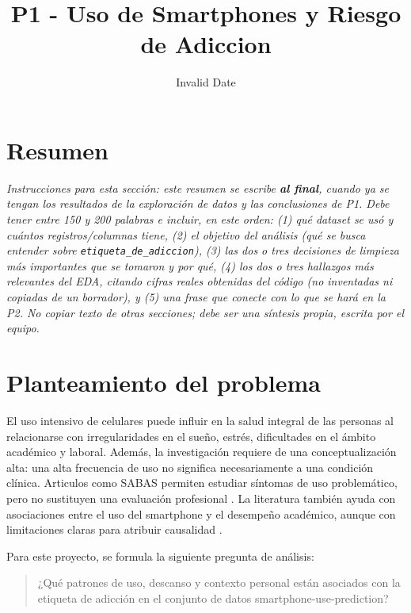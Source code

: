 \documentclass[11pt,spanish,a4paper,]{article}
\title{P1 - Uso de Smartphones y Riesgo de Adiccion}
\author{\sf{\Large\textbf{Hiter Frank Rubio
Peralta}\\\large Alumno\\[0.5cm]}{\Large\textbf{Jossep Jorge Froilan
Choroco Neyra}\\\large Alumno\\[0.5cm]}{\Large\textbf{Joel David De la
Cruz Cardenas}\\\large Alumno\\[0.5cm]}{\Large\textbf{Rodrigo Octavio
Lucatoni Flores Ruiz}\\\large Alumno\\[0.5cm]}{\Large\textbf{Victor
Andres Diaz Garcia}\\\large Alumno\\[0.5cm]}}
\date{Invalid Date}
\makeatletter
\def\titlepage{\front{\expandafter{\@title}}{\@author}{\@organization}}
\makeatother
\begin{document}
\titlepage

{
\hypersetup{linkcolor=black}
\setcounter{tocdepth}{2}
\tableofcontents
}
\listoftables
\listoffigures
\providecommand{\pandocbounded}[1]{#1}

\newpage

\section{Resumen}\label{resumen}

\emph{Instrucciones para esta sección: este resumen se escribe
\textbf{al final}, cuando ya se tengan los resultados de la exploración
de datos y las conclusiones de P1. Debe tener entre 150 y 200 palabras e
incluir, en este orden: (1) qué dataset se usó y cuántos
registros/columnas tiene, (2) el objetivo del análisis (qué se busca
entender sobre \texttt{etiqueta\_de\_adiccion}), (3) las dos o tres
decisiones de limpieza más importantes que se tomaron y por qué, (4) los
dos o tres hallazgos más relevantes del EDA, citando cifras reales
obtenidas del código (no inventadas ni copiadas de un borrador), y (5)
una frase que conecte con lo que se hará en la P2. No copiar texto de
otras secciones; debe ser una síntesis propia, escrita por el equipo.}

\section{Planteamiento del problema}\label{planteamiento-del-problema}

El uso intensivo de celulares puede influir en la salud integral de las
personas al relacionarse con irregularidades en el sueño, estrés,
dificultades en el ámbito académico y laboral. Además, la investigación
requiere de una conceptualización alta: una alta frecuencia de uso no
significa necesariamente a una condición clínica. Articulos como SABAS
permiten estudiar síntomas de uso problemático, pero no sustituyen una
evaluación profesional \textcite{Csibi2018}. La literatura también ayuda
con asociaciones entre el uso del smartphone y el desempeño académico,
aunque con limitaciones claras para atribuir causalidad
\textcite{AmezBaert2020}.

Para este proyecto, se formula la siguiente pregunta de análisis:

\begin{quote}
¿Qué patrones de uso, descanso y contexto personal están asociados con
la etiqueta de adicción en el conjunto de datos
smartphone-use-prediction?
\end{quote}
\end{document}
